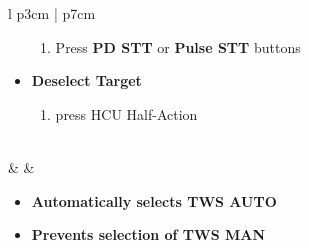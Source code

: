 \documentclass[8pt,usenames,dvipsnames,twoside]{article}
\begin{document}
\begin{center}
\begin{longtable}{l p{3cm} | p{7cm}}
\begin{minipage}[t]{\linewidth}
\begin{itemize}
\begin{enumerate}[label=(\alph*), resume]
							\item Press \textbf{PD STT} or \textbf{Pulse STT} buttons
						\end{enumerate}
						\item \textbf{Deselect Target}
						\begin{enumerate}[label=(\alph*), resume]
							\item press HCU Half-Action
						\end{enumerate}
					\end{itemize}
				\end{minipage} \\
				\midrule
				\textbullet &  & 
				\begin{minipage}[t]{\linewidth}
					\vspace{-7pt}
					\begin{itemize}
						\item \textbf{Automatically selects TWS AUTO}
						\item \textbf{Prevents selection of TWS MAN}
					\end{itemize}
				\end{minipage} \\
				\bottomrule
			\end{longtable}
		\end{center}
	
		\clearpage
	
\end{document}
